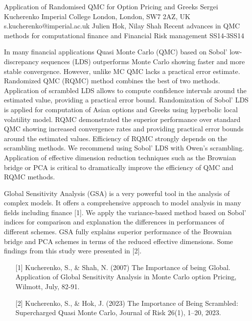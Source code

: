 \begin{talk}
  {Application of Randomised QMC for Option Pricing and Greeks}%
  {Sergei Kucherenko}%
  {Imperial College London, London, SW7 2AZ, UK}%
  {s.kucherenko@imperial.ac.uk}%
  {Julien Hok, Nilay Shah}%
{Recent advances in QMC methods for computational finance and Financial Risk management}
{}{SS14-3}{SS14}

			
In many financial applications Quasi Monte Carlo (QMC) based on
Sobol’ low-discrepancy sequences (LDS) outperforms Monte Carlo
showing faster and more stable convergence.
However, unlike MC QMC lacks a practical error estimate. Randomized QMC (RQMC)
method combines the best of two methods.
Application of scrambled LDS allows to compute confidence intervals around the estimated value,
providing a practical error bound. Randomization of Sobol' LDS
is applied for computation of Asian options and Greeks
using hyperbolic local volatility model.
RQMC demonstrated the superior performance over standard QMC
showing increased convergence rates and providing
practical error bounds around the estimated values.
Efficiency of RQMC strongly depends on the scrambling methods. We recommend using
Sobol’ LDS with Owen’s scrambling. Application of effective dimension
reduction techniques such as the Brownian bridge or
PCA is critical to dramatically improve the efficiency of QMC and RQMC
methods.

Global Sensitivity Analysis (GSA) is a very powerful tool in the analysis of complex models. It offers a comprehensive approach to model analysis in many fields including finance [1].
We apply the variance-based method based on Sobol’ indices for comparison and explanation the differences in performances of different schemes.
GSA fully explains superior performance of the Brownian bridge and PCA schemes in terms of the reduced effective dimensions.
Some findings from this study were presented in [2]. 

\medskip


\begin{enumerate}
    \item[{[1]}]  Kucherenko, S., \& Shah, N. (2007) The Importance of being Global. Application of Global Sensitivity Analysis in Monte Carlo option Pricing, Wilmott, July, 82-91. 
	\item[{[2]}] Kucherenko, S., \& Hok, J. (2023) The Importance of Being Scrambled: Supercharged Quasi Monte Carlo, Journal of Risk 26(1), 1–20, 2023. 
    


\end{enumerate}

\end{talk}

